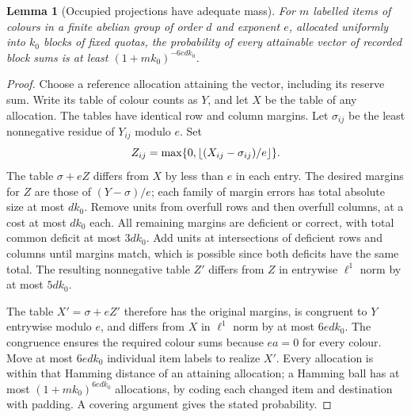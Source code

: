 \documentclass[11pt]{article}
\newtheorem{lemma}[theorem]{Lemma}
\theoremstyle{remark}\newtheorem{remark}[theorem]{Remark}
\begin{document}
\begin{lemma}[Occupied projections have adequate mass]\label{lem:repair}
For $m$ labelled items of colours in a finite abelian group of order $d$ and exponent $e$, allocated uniformly into $k_0$ blocks of fixed quotas, the probability of every attainable vector of recorded block sums is at least $(1+mk_0)^{-6edk_0}$.
\end{lemma}
\begin{proof}
Choose a reference allocation attaining the vector, including its reserve sum. Write its table of colour counts as $Y$, and let $X$ be the table of any allocation. The tables have identical row and column margins. Let $\sigma_{ij}$ be the least nonnegative residue of $Y_{ij}$ modulo $e$. Set
\[
 Z_{ij}=\max\{0,\left\lfloor (X_{ij}-\sigma_{ij})/e\right\rfloor\}.
\]
The table $\sigma+eZ$ differs from $X$ by less than $e$ in each entry. The desired margins for $Z$ are those of $(Y-\sigma)/e$; each family of margin errors has total absolute size at most $dk_0$. Remove units from overfull rows and then overfull columns, at a cost at most $dk_0$ each. All remaining margins are deficient or correct, with total common deficit at most $3dk_0$. Add units at intersections of deficient rows and columns until margins match, which is possible since both deficits have the same total. The resulting nonnegative table $Z'$ differs from $Z$ in entrywise $\ell^1$ norm by at most $5dk_0$.

The table $X'=\sigma+eZ'$ therefore has the original margins, is congruent to $Y$ entrywise modulo $e$, and differs from $X$ in $\ell^1$ norm by at most $6edk_0$. The congruence ensures the required colour sums because $ea=0$ for every colour. Move at most $6edk_0$ individual item labels to realize $X'$. Every allocation is within that Hamming distance of an attaining allocation; a Hamming ball has at most $(1+mk_0)^{6edk_0}$ allocations, by coding each changed item and destination with padding. A covering argument gives the stated probability.
\end{proof}
\end{document}
